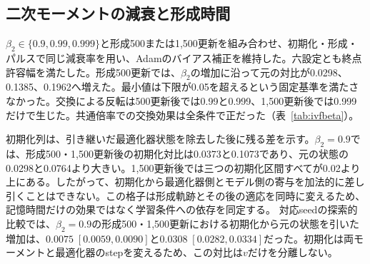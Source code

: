 \subsection{二次モーメントの減衰と形成時間}
$\beta_2\in\{0.9,0.99,0.999\}$と形成500または1,500更新を組み合わせ、初期化・形成・パルスで同じ減衰率を用い、Adamのバイアス補正を維持した。六設定とも終点許容幅を満たした。形成500更新では、$\beta_2$の増加に沿って元の対比が0.0298、0.1385、0.1962へ増えた。最小値は下限が0.05を超えるという固定基準を満たさなかった。交換による反転は500更新後では0.99と0.999、1,500更新後では0.999だけで生じた。共通倍率での交換効果は全条件で正だった（表~\ref{tab:ivfbeta}）。

初期化列は、引き継いだ最適化器状態を除去した後に残る差を示す。$\beta_2=0.9$では、形成500・1,500更新後の初期化対比は0.0373と0.1073であり、元の状態の0.0298と0.0764より大きい。1,500更新後では三つの初期化区間すべてが0.02より上にある。したがって、初期化から最適化器側とモデル側の寄与を加法的に差し引くことはできない。この格子は形成軌跡とその後の適応を同時に変えるため、記憶時間だけの効果ではなく学習条件への依存を同定する。 対応seedの探索的比較では、$\beta_2=0.9$の形成500・1,500更新における初期化から元の状態を引いた増加は、$0.0075\;[0.0059,0.0090]$と$0.0308\;[0.0282,0.0334]$だった。初期化は両モーメントと最適化器のstepを変えるため、この対比は$v$だけを分離しない。

